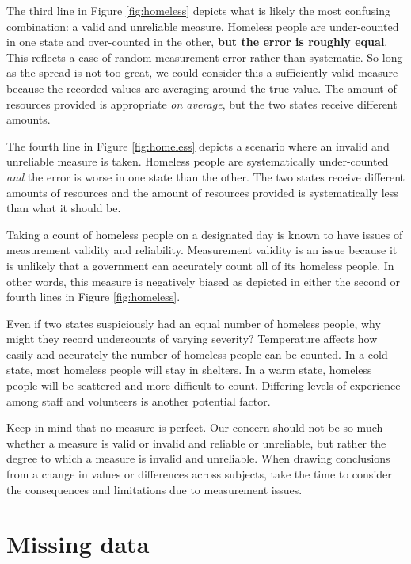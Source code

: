 \documentclass[
]{book}
\begin{document}
The third line in Figure \ref{fig:homeless} depicts what is likely the most confusing combination: a valid and unreliable measure. Homeless people are under-counted in one state and over-counted in the other, \textbf{but the error is roughly equal}. This reflects a case of random measurement error rather than systematic. So long as the spread is not too great, we could consider this a sufficiently valid measure because the recorded values are averaging around the true value. The amount of resources provided is appropriate \emph{on average}, but the two states receive different amounts.

The fourth line in Figure \ref{fig:homeless} depicts a scenario where an invalid and unreliable measure is taken. Homeless people are systematically under-counted \emph{and} the error is worse in one state than the other. The two states receive different amounts of resources and the amount of resources provided is systematically less than what it should be.

Taking a count of homeless people on a designated day is known to have issues of measurement validity and reliability. Measurement validity is an issue because it is unlikely that a government can accurately count all of its homeless people. In other words, this measure is negatively biased as depicted in either the second or fourth lines in Figure \ref{fig:homeless}.

Even if two states suspiciously had an equal number of homeless people, why might they record undercounts of varying severity? Temperature affects how easily and accurately the number of homeless people can be counted. In a cold state, most homeless people will stay in shelters. In a warm state, homeless people will be scattered and more difficult to count. Differing levels of experience among staff and volunteers is another potential factor.

Keep in mind that no measure is perfect. Our concern should not be so much whether a measure is valid or invalid and reliable or unreliable, but rather the degree to which a measure is invalid and unreliable. When drawing conclusions from a change in values or differences across subjects, take the time to consider the consequences and limitations due to measurement issues.

\hypertarget{missing-data}{%
\section{Missing data}\label{missing-data}}
\end{document}
